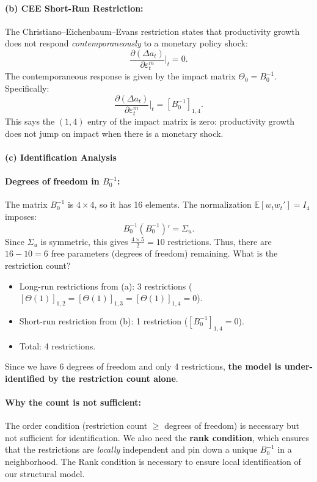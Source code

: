 \documentclass[12pt]{article}
\newcommand{\E}{\mathbb E}
\theoremstyle{definition}
\begin{document}
\bigskip
\paragraph{(b) CEE Short-Run Restriction: } The Christiano--Eichenbaum--Evans restriction states that productivity growth does not respond \emph{contemporaneously} to a monetary policy shock:
\[
\frac{\partial (\Delta a_t)}{\partial \varepsilon_t^m}\Big|_t = 0.
\]
The contemporaneous response is given by the impact matrix $\Theta_0 = B_0^{-1}$. Specifically:
\[
\frac{\partial (\Delta a_t)}{\partial \varepsilon_t^m}\Big|_t = [B_0^{-1}]_{1,4}.
\]
This says the $(1,4)$ entry of the impact matrix is zero: productivity growth does not jump on impact when there is a monetary shock.

\bigskip
\paragraph{(c) Identification Analysis}

\paragraph{Degrees of freedom in $B_0^{-1}$:} The matrix $B_0^{-1}$ is $4 \times 4$, so it has 16 elements. The normalization $\E[w_t w_t'] = I_4$ imposes:
\[
B_0^{-1} (B_0^{-1})' = \Sigma_u.
\]
Since $\Sigma_u$ is symmetric, this gives $\frac{4 \times 5}{2} = 10$ restrictions. Thus, there are $16 - 10 = 6$ free parameters (degrees of freedom) remaining. What is the restriction count?
\begin{itemize}
    \item Long-run restrictions from (a): 3 restrictions ($[\Theta(1)]_{1,2} = [\Theta(1)]_{1,3} = [\Theta(1)]_{1,4} = 0$).
    \item Short-run restriction from (b): 1 restriction ($[B_0^{-1}]_{1,4} = 0$).
    \item Total: 4 restrictions.
\end{itemize}
Since we have 6 degrees of freedom and only 4 restrictions, \textbf{the model is under-identified by the restriction count alone}.

\paragraph{Why the count is not sufficient:} The order condition (restriction count $\geq$ degrees of freedom) is necessary but not sufficient for identification. We also need the \textbf{rank condition}, which ensures that the restrictions are \emph{locally} independent and pin down a unique $B_0^{-1}$ in a neighborhood. The Rank condition is necessary to ensure local identification of our structural model.
\end{document}
